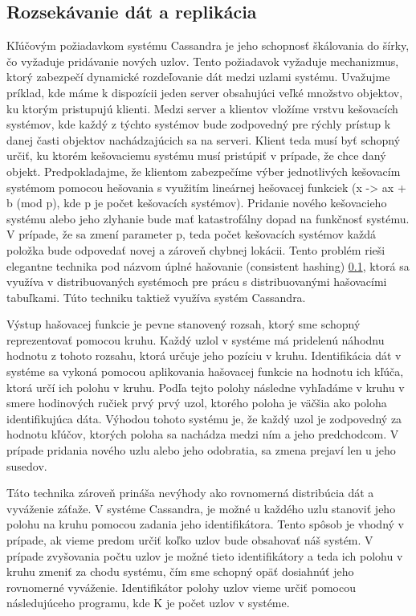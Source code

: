 \documentclass[11pt,twoside,a4paper]{book}
\begin{document}
\subsection{Rozsekávanie dát a replikácia}
Kľúčovým požiadavkom systému Cassandra je jeho schopnosť škálovania do šírky, čo vyžaduje pridávanie nových uzlov. Tento požiadavok vyžaduje mechanizmus, ktorý zabezpečí dynamické rozdeľovanie dát medzi uzlami systému. Uvažujme príklad, kde máme k dispozícii jeden server obsahujúci veľké množstvo objektov, ku ktorým pristupujú klienti. Medzi server a klientov vložíme vrstvu kešovacích systémov, kde každý z týchto systémov bude zodpovedný pre rýchly prístup k danej časti objektov nachádzajúcich sa na serveri. Klient teda musí byť schopný určiť, ku ktorém kešovaciemu systému musí pristúpiť v prípade, že chce daný objekt. Predpokladajme, že klientom zabezpečíme výber jednotlivých kešovacím systémom pomocou hešovania s využitím lineárnej hešovacej funkciek (x -> ax + b (mod p), kde p je počet kešovacích systémov). Pridanie nového kešovacieho systému alebo jeho zlyhanie bude mať katastrofálny dopad na funkčnosť systému. V prípade, že sa zmení parameter p, teda počet kešovacích systémov každá položka bude odpovedať novej a zároveň chybnej lokácii. Tento problém rieši elegantne technika pod názvom úplné hašovanie (consistent hashing) \ref{}, ktorá sa využíva v distribuovaných systémoch pre prácu s distribuovanými hašovacími tabuľkami. Túto techniku taktiež využíva systém Cassandra.

Výstup hašovacej funkcie je pevne stanovený rozsah, ktorý sme schopný reprezentovať pomocou kruhu. Každý uzlol v systéme má pridelenú náhodnu hodnotu z tohoto rozsahu, ktorá určuje jeho pozíciu v kruhu. Identifikácia dát v systéme sa vykoná pomocou aplikovania hašovacej funkcie na hodnotu ich kľúča, ktorá určí ich polohu v kruhu. Podľa tejto polohy následne vyhľadáme v kruhu v smere hodinových ručiek prvý prvý uzol, ktorého poloha je väčšia ako poloha identifikujúca dáta. Výhodou tohoto systému je, že každý uzol je zodpovedný za hodnotu kľúčov, ktorých poloha sa nachádza medzi ním a jeho predchodcom. V prípade pridania nového uzlu alebo jeho odobratia, sa zmena prejaví len u jeho susedov. 

Táto technika zároveň prináša nevýhody ako rovnomerná distribúcia dát a vyváženie záťaže. V systéme Cassandra, je možné u každého uzlu stanoviť jeho polohu na kruhu pomocou zadania jeho identifikátora. Tento spôsob je vhodný v prípade, ak vieme predom určiť koľko uzlov bude obsahovať náš systém. V prípade zvyšovania počtu uzlov je možné tieto identifikátory a teda ich polohu v kruhu zmeniť za chodu systému, čím sme schopný opäť dosiahnúť jeho rovnomerné vyváženie. Identifikátor polohy uzlov vieme určiť pomocou následujúceho programu, kde K je počet uzlov v systéme.
\end{document}
